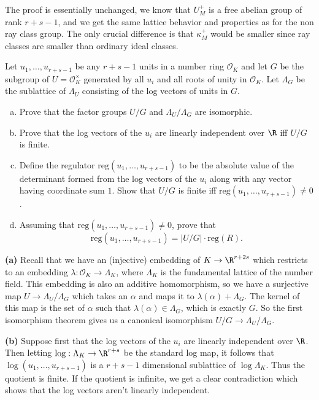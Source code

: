 \documentclass[11pt,letterpaper]{article}
\begin{document}
\begin{solution}
    The proof is essentially unchanged, we know that $U^+_M$ is a free abelian group of rank $r+s-1$, and we get the same lattice behavior and properties as for the non ray class group. The only crucial difference is that $\kappa^+_M$ would be smaller since ray classes are smaller than ordinary ideal classes.
\end{solution}

\begin{cproblem}{6.14}
    Let $u_1,\ldots,u_{r+s-1}$ be any $r+s-1$ units in a number ring $\mathcal{O}_K$ and let $G$ be the subgroup of $U=\mathcal{O}_K^\times$ generated by all $u_i$ and all roots of unity in $\mathcal{O}_K$. Let $\Lambda_G$ be the sublattice of $\Lambda_U$ consisting of the log vectors of units in $G$.
    \begin{enumerate}[(a)]
        \item Prove that the factor groups $U / G$ and ${\Lambda_U}/{\Lambda_G}$ are isomorphic.
        \item Prove that the log vectors of the $u_i$ are linearly independent over $\R$ iff $U / G$ is finite.
        \item Define the regulator $\textrm{reg}(u_1,\ldots,u_{r+s-1})$ to be the absolute value of the determinant formed from the log vectors of the $u_i$ along with any vector having coordinate sum $1$. %
            Show that $U /G$ is finite iff $\textrm{reg}(u_1,\ldots,u_{r+s-1})\neq 0$.
        \item Assuming that $\textrm{reg}(u_1,\ldots,u_{r+s-1})\neq 0$, prove that
        \[
            \textrm{reg}(u_1,\ldots,u_{r+s-1})=|U / G|\cdot \textrm{reg}(R)  
        .\] 
    \end{enumerate}
\end{cproblem}

\begin{solution}
    \textbf{(a)} Recall that we have an (injective) embedding of $K \to \R^{r+2s}$ which restricts to an embedding $\lambda : \mathcal{O}_K \to \Lambda_K$, where $\Lambda_K$ is the fundamental lattice of the number field. This embedding is also an additive homomorphism, so we have a surjective map $U \to \Lambda_U / \Lambda_G$ which takes an $\alpha$ and maps it to $\lambda(\alpha) + \Lambda_G$. The kernel of this map is the set of $\alpha$ such that $\lambda(\alpha)\in \Lambda_G$, which is exactly $G$. So the first isomorphism theorem gives us a canonical isomorphism $U /G \to \Lambda_U / \Lambda_G$.
    
    \textbf{(b)} Suppose first that the log vectors of the $u_i$ are linearly independent over $\R$. Then letting $\log : \Lambda_K \to \R^{r+s}$ be the standard log map, it follows that $\log(u_1,\ldots,u_{r+s-1})$ is a $r+s-1$ dimensional sublattice of $\log \Lambda_K$. Thus the quotient is finite. If the quotient is infinite, we get a clear contradiction which shows that the log vectors aren't linearly independent. 
\end{solution}
\end{document}
